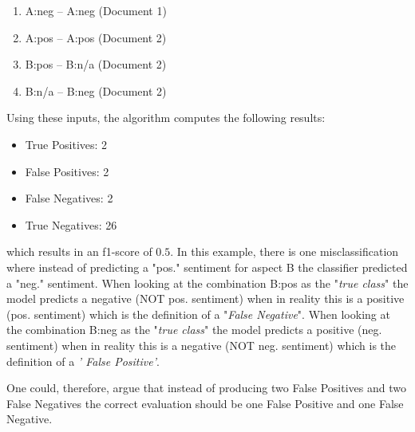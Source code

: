 \begin{enumerate}
    \item A:neg -- A:neg (Document 1)
    \item A:pos -- A:pos (Document 2)
    \item B:pos -- B:n/a (Document 2)
    \item B:n/a -- B:neg (Document 2)
\end{enumerate}

Using these inputs, the algorithm computes the following results:

\begin{itemize}
    \item True Positives: 2
    \item False Positives: 2
    \item False Negatives: 2
    \item True Negatives: 26
\end{itemize}

which results in an f1-score of $0.5$. In this example, there is one misclassification where instead of predicting a "pos." sentiment for aspect B the classifier predicted a "neg." sentiment. When looking at the combination B:pos as the "\textit{true class}" the model predicts a negative {(NOT pos. sentiment)} when in reality this is a positive {(pos. sentiment)} which is the definition of a "\textit{False Negative}". When looking at the combination B:neg as the "\textit{true class}" the model predicts a positive {(neg. sentiment)} when in reality this is a negative {(NOT neg. sentiment)} which is the definition of a \textit{' False Positive'}.
\medskip

One could, therefore, argue that instead of producing two False Positives and two False Negatives the correct evaluation should be one False Positive and one False Negative.

